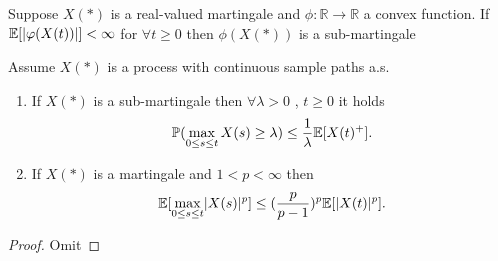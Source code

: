 \begin{lemma}
  Suppose $X(*)$ is a real-valued martingale and $\phi  : \mathbb{R} \to  \mathbb{R}$ a convex function.
  If $\mathbb{E}[\lvert\varphi(X(t))\rvert] < \infty $ for $\forall  t\ge 0$ then $\phi(X(*))$ is a sub-martingale
\end{lemma}
\begin{theorem}
 Assume $X(*)$  is a process with continuous sample paths a.s. 
 \begin{enumerate}
   \item If $X(*)$ is a sub-martingale then $\forall  \lambda > 0$ , $t \ge 0$ it holds 
     \begin{align*}
       \mathbb{P}(\max_{0\le s\le t} X(s) \ge \lambda ) \le  \frac{1}{\lambda }\mathbb{E}[X(t)^{+} ]
     .\end{align*}
    \item If $X(*)$ is a martingale and $1 < p < \infty$ then
      \begin{align*}
        \mathbb{E}[\max_{0\le s\le t} \lvert X(s) \rvert^{p} ] \le (\frac{p}{p-1})^{p} \mathbb{E}[\lvert X(t)\rvert^{p} ]
      .\end{align*}
 \end{enumerate}
\end{theorem}
\begin{proof}
 Omit 
\end{proof}
